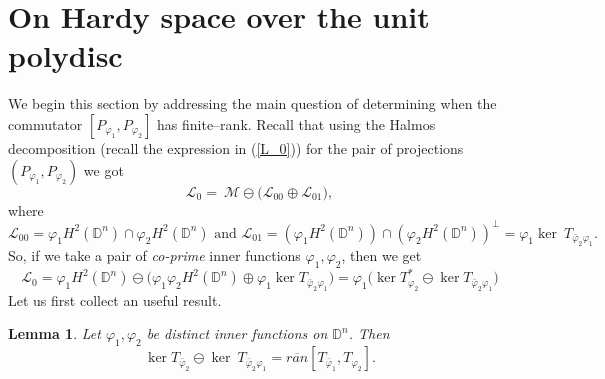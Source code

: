 \documentclass[12pt, a4 paper]{amsart}
\newcommand{\cll}{\mathcal{L}}
\newcommand{\clm}{\mathcal{M}}
\newcommand{\D}{\mathbb{D}}
\theoremstyle{definition}
\theoremstyle{plain}
\newtheorem{lem}[thm]{Lemma}
\theoremstyle{definition}
\numberwithin{equation}{section}
\let\phi=\varphi
\begin{document}
\section{On Hardy space over the unit polydisc}\label{sec6}
 We begin this section by addressing the main question of determining when the commutator $[P_{\phi_1}, P_{\phi_2}]$ has finite--rank. Recall that using the Halmos decomposition (recall the expression in (\ref{L_0})) for the pair of projections $(P_{\phi_1}, P_{\phi_2})$ we got
\[
\cll_0 =~\clm \ominus \big( \cll_{00} \oplus \cll_{01} \big),
\]
where
\[
\cll_{00} = \phi_1 H^2(\D^n) \cap \phi_2 H^2(\D^n) \text{ and } \cll_{01}= \left(\phi_1 H^2(\mathbb{D}^n )\right)\cap\left(\phi_2 H^2(\mathbb{D}^n )\right)^{\perp} = \phi_1 \ker~T_{\bar \phi_2 \phi_1}.
\]
So, if we take a pair of \textit{co-prime} inner functions $\phi_1, \phi_2$, then we get
\[
\cll_0 = \phi_1 H^2(\D^n) \ominus \big(\phi_1 \phi_2 H^2(\D^n) \oplus \phi_1 \ker T_{\bar \phi_2 \phi_1}\big) = \phi_1 \big(\ker T_{\phi_2}^* \ominus \ker T_{\bar \phi_2 \phi_1} \big)
\]
Let us first collect an useful result.
\begin{lem}\label{lem_com}
Let $\phi_1, \phi_2$ be distinct inner functions on $\D^n$. Then $$ \ker T_{\bar \phi_2} \ominus \ker~T_{\bar \phi_2 \phi_1} = \overline{ran  } [T_{\bar \phi_1}, T_{\phi_2}].$$
\end{lem}
\end{document}
